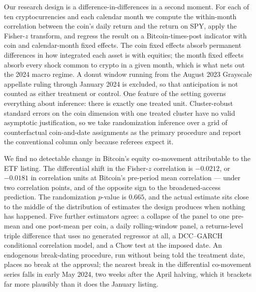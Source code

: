 \documentclass[12pt,a4paper]{article}
\begin{document}
Our research design is a difference-in-differences in a second moment. For each of ten cryptocurrencies and each calendar month we compute the within-month correlation between the coin's daily return and the return on SPY, apply the Fisher-$z$ transform, and regress the result on a Bitcoin-times-post indicator with coin and calendar-month fixed effects. The coin fixed effects absorb permanent differences in how integrated each asset is with equities; the month fixed effects absorb every shock common to crypto in a given month, which is what nets out the 2024 macro regime. A donut window running from the August 2023 Grayscale appellate ruling through January 2024 is excluded, so that anticipation is not counted as either treatment or control. One feature of the setting governs everything about inference: there is exactly one treated unit. Cluster-robust standard errors on the coin dimension with one treated cluster have no valid asymptotic justification, so we take randomization inference over a grid of counterfactual coin-and-date assignments as the primary procedure and report the conventional column only because referees expect it.

We find no detectable change in Bitcoin's equity co-movement attributable to the ETF listing. The differential shift in the Fisher-$z$ correlation is
$-0.0212$,
or $-0.0181$ in correlation units at Bitcoin's pre-period mean correlation — under two correlation points, and of the opposite sign to the broadened-access prediction.
The randomization $p$-value is $0.665$, and the actual estimate sits close to the middle of the distribution of estimates the design produces when nothing has happened. Five further estimators agree: a collapse of the panel to one pre-mean and one post-mean per coin, a daily rolling-window panel, a returns-level triple difference that uses no generated regressor at all, a DCC--GARCH conditional correlation model, and a Chow test at the imposed date. An endogenous break-dating procedure, run without being told the treatment date, places no break at the approval; the nearest break in the differential co-movement series falls in early May 2024, two weeks after the April halving, which it brackets far more plausibly than it does the January listing.
\end{document}
